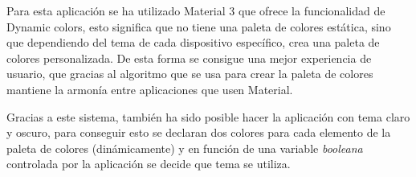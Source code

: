 Para esta aplicación se ha utilizado Material 3 que ofrece la funcionalidad de Dynamic colors, esto significa que no tiene una paleta de colores estática, sino que dependiendo del tema de cada dispositivo específico, crea una paleta de colores personalizada. De esta forma se consigue una mejor experiencia de usuario, que gracias al algoritmo que se usa para crear la paleta de colores mantiene la armonía entre aplicaciones que usen Material.

Gracias a este sistema, también ha sido posible hacer la aplicación con tema claro y oscuro, para conseguir esto se declaran dos colores para cada elemento de la paleta de colores (dinámicamente) y en función de una variable \textit{booleana} controlada por la aplicación se decide que tema se utiliza.